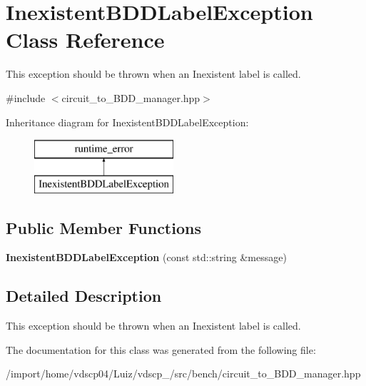 \section{Inexistent\+B\+D\+D\+Label\+Exception Class Reference}
\label{classInexistentBDDLabelException}


This exception should be thrown when an Inexistent label is called.  




{\ttfamily \#include $<$circuit\+\_\+to\+\_\+\+B\+D\+D\+\_\+manager.\+hpp$>$}

Inheritance diagram for Inexistent\+B\+D\+D\+Label\+Exception\+:\begin{figure}[H]
\begin{center}
\leavevmode
\includegraphics[height=2.000000cm]{classInexistentBDDLabelException}
\end{center}
\end{figure}
\subsection*{Public Member Functions}
\begin{DoxyCompactItemize}
\item 
{\bfseries Inexistent\+B\+D\+D\+Label\+Exception} (const std\+::string \&message)\label{classInexistentBDDLabelException_a04979bc3d74b3d2ec7b0232639b9c862}

\end{DoxyCompactItemize}


\subsection{Detailed Description}
This exception should be thrown when an Inexistent label is called. 

The documentation for this class was generated from the following file\+:\begin{DoxyCompactItemize}
\item 
/import/home/vdscp04/\+Luiz/vdscp\+\_/src/bench/circuit\+\_\+to\+\_\+\+B\+D\+D\+\_\+manager.\+hpp\end{DoxyCompactItemize}
